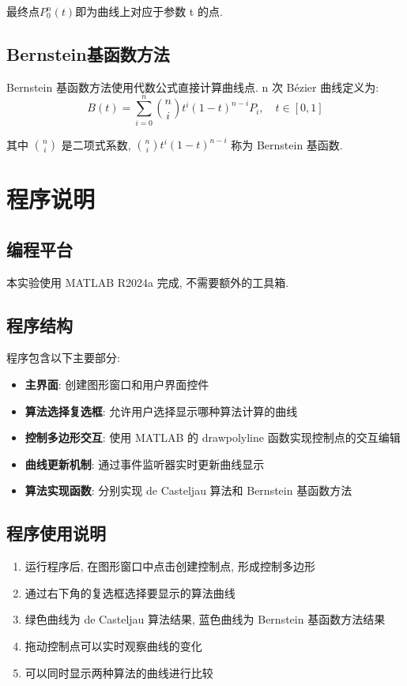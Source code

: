 \documentclass[12pt,a4paper]{report}
\begin{document}
            最终点$P_{0}^{n}\left(t\right)$即为曲线上对应于参数 t 的点.

        \section{Bernstein基函数方法}
            Bernstein 基函数方法使用代数公式直接计算曲线点. n 次 Bézier 曲线定义为:
            \begin{equation*}
                B\left(t\right) = \sum_{i=0}^{n} \binom{n}{i} t^{i} \left(1 - t\right)^{n - i} P_{i}, \quad t \in \left[0, 1\right]
            \end{equation*}
            
            其中 $\binom{n}{i}$ 是二项式系数, $\binom{n}{i} t^i (1-t)^{n-i}$ 称为 Bernstein 基函数.

    \chapter{程序说明}
        \section{编程平台}
            本实验使用 MATLAB R2024a 完成, 不需要额外的工具箱.

        \section{程序结构}
            程序包含以下主要部分:
            \begin{itemize}
                \item \textbf{主界面}: 创建图形窗口和用户界面控件
                \item \textbf{算法选择复选框}: 允许用户选择显示哪种算法计算的曲线
                \item \textbf{控制多边形交互}: 使用 MATLAB 的 drawpolyline 函数实现控制点的交互编辑
                \item \textbf{曲线更新机制}: 通过事件监听器实时更新曲线显示
                \item \textbf{算法实现函数}: 分别实现 de Casteljau 算法和 Bernstein 基函数方法
            \end{itemize}

        \section{程序使用说明}
            \begin{enumerate}
                \item 运行程序后, 在图形窗口中点击创建控制点, 形成控制多边形
                \item 通过右下角的复选框选择要显示的算法曲线
                \item 绿色曲线为 de Casteljau 算法结果, 蓝色曲线为 Bernstein 基函数方法结果
                \item 拖动控制点可以实时观察曲线的变化
                \item 可以同时显示两种算法的曲线进行比较
            \end{enumerate}
\end{document}
